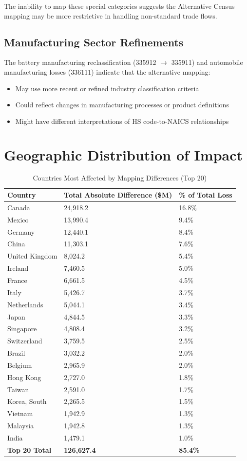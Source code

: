 \documentclass[11pt]{article}
\begin{document}
The inability to map these special categories suggests the Alternative Census mapping may be more restrictive in handling non-standard trade flows.

\subsection{Manufacturing Sector Refinements}

The battery manufacturing reclassification (335912 $\rightarrow$ 335911) and automobile manufacturing losses (336111) indicate that the alternative mapping:
\begin{itemize}
\item May use more recent or refined industry classification criteria
\item Could reflect changes in manufacturing processes or product definitions
\item Might have different interpretations of HS code-to-NAICS relationships
\end{itemize}

\section{Geographic Distribution of Impact}

\begin{table}[H]
\centering
\caption{Countries Most Affected by Mapping Differences (Top 20)}
\begin{tabular}{lR{2.5cm}R{2cm}}
\toprule
\textbf{Country} & \textbf{Total Absolute Difference (\$M)} & \textbf{\% of Total Loss} \\
\midrule
Canada & 24,918.2 & 16.8\% \\
Mexico & 13,990.4 & 9.4\% \\
Germany & 12,440.1 & 8.4\% \\
China & 11,303.1 & 7.6\% \\
United Kingdom & 8,024.2 & 5.4\% \\
Ireland & 7,460.5 & 5.0\% \\
France & 6,661.5 & 4.5\% \\
Italy & 5,426.7 & 3.7\% \\
Netherlands & 5,044.1 & 3.4\% \\
Japan & 4,844.5 & 3.3\% \\
Singapore & 4,808.4 & 3.2\% \\
Switzerland & 3,759.5 & 2.5\% \\
Brazil & 3,032.2 & 2.0\% \\
Belgium & 2,965.9 & 2.0\% \\
Hong Kong & 2,727.0 & 1.8\% \\
Taiwan & 2,591.0 & 1.7\% \\
Korea, South & 2,265.5 & 1.5\% \\
Vietnam & 1,942.9 & 1.3\% \\
Malaysia & 1,942.8 & 1.3\% \\
India & 1,479.1 & 1.0\% \\
\midrule
\textbf{Top 20 Total} & \textbf{126,627.4} & \textbf{85.4\%} \\
\bottomrule
\end{tabular}
\label{tab:geographic_impact}
\end{table}
\end{document}
